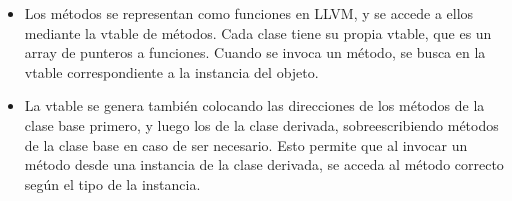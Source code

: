 \documentclass{article}
\begin{document}
\begin{enumerate}
\begin{itemize}
        \item Los métodos se representan como funciones en LLVM, y se accede a ellos mediante la vtable de métodos. Cada clase tiene su propia vtable, que es un array de punteros a funciones. Cuando se invoca un método, se busca en la vtable correspondiente a la instancia del objeto.
        \item La vtable se genera también colocando las direcciones de los métodos de la clase base primero, y luego los de la clase derivada, sobreescribiendo métodos de la clase base en caso de ser necesario. Esto permite que al invocar un método desde una instancia de la clase derivada, se acceda al método correcto según el tipo de la instancia.
      \end{itemize}
\end{enumerate}
\end{document}
